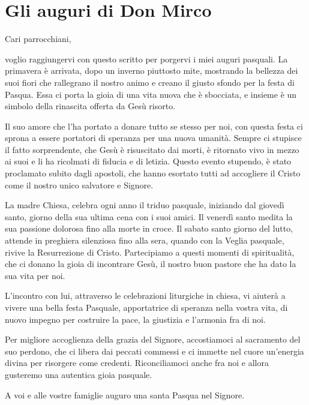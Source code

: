 \section{Gli auguri di Don Mirco}
Cari parrocchiani,

voglio raggiungervi con questo scritto per porgervi i miei auguri pasquali. La primavera è arrivata, dopo un inverno piuttosto mite, mostrando la bellezza dei suoi fiori che rallegrano il nostro animo e creano il giusto sfondo per la festa di Pasqua. Essa ci porta la gioia di una vita nuova che è sbocciata, e insieme è un simbolo della rinascita offerta da Gesù risorto.

Il suo amore che l’ha portato a donare tutto se stesso per noi, con questa festa ci sprona a essere portatori di speranza per una nuova umanità. Sempre ci stupisce il fatto sorprendente, che Gesù è risuscitato dai morti, è ritornato vivo in mezzo ai suoi e li ha ricolmati di fiducia e di letizia. Questo evento stupendo, è stato proclamato subito dagli apostoli, che hanno esortato tutti ad accogliere il Cristo come il nostro unico salvatore e Signore.

La madre Chiesa, celebra ogni anno il triduo pasquale, iniziando dal giovedì santo, giorno della sua ultima cena con i suoi amici. Il venerdì santo medita la sua passione dolorosa fino alla morte in croce. Il sabato santo giorno del lutto, attende in preghiera silenziosa fino alla sera, quando con la Veglia pasquale, rivive la Resurrezione di Cristo. Partecipiamo a questi momenti di spiritualità, che ci donano la gioia di incontrare Gesù, il nostro buon pastore che ha dato la sua vita per noi.

L’incontro con lui, attraverso le celebrazioni liturgiche in chiesa, vi aiuterà a vivere una bella festa Pasquale, apportatrice di speranza nella vostra vita, di nuovo impegno per costruire la pace, la giustizia e l’armonia fra di noi.

Per migliore accoglienza della grazia del Signore, accostiamoci al sacramento del suo perdono, che ci libera dai peccati commessi e ci immette nel cuore un’energia divina per risorgere come credenti. Riconciliamoci anche fra noi e allora gusteremo una autentica gioia pasquale.

A voi e alle vostre famiglie auguro una santa Pasqua nel Signore.

